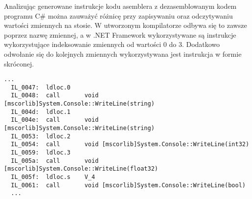 \par Analizując generowane instrukcje kodu asemblera z dezasemblowanym kodem programu C\# można zauważyć różnicę przy zapisywaniu oraz odczytywaniu wartości zmiennych na stosie. W utworzonym kompilatorze odbywa się to zawsze poprzez nazwę zmiennej, a w .NET Framework wykorzystywane są instrukcje wykorzystujące indeksowanie zmiennych od wartości 0 do 3. Dodatkowo odwołanie się do kolejnych zmiennych wykorzystywana jest instrukcja w formie skróconej.


\begin{lstlisting}[language=IL, caption={Fragment kodu deasemblerowanego testu programu C\#, przedstawiający ładowanie wartości zmiennych na stos}, label=alg:asm]
  ...
  IL_0047:  ldloc.0
  IL_0048:  call       void [mscorlib]System.Console::WriteLine(string)
  IL_004d:  ldloc.1
  IL_004e:  call       void [mscorlib]System.Console::WriteLine(string)
  IL_0053:  ldloc.2
  IL_0054:  call       void [mscorlib]System.Console::WriteLine(int32)
  IL_0059:  ldloc.3
  IL_005a:  call       void [mscorlib]System.Console::WriteLine(float32)
  IL_005f:  ldloc.s    V_4
  IL_0061:  call       void [mscorlib]System.Console::WriteLine(bool)
  ...
\end{lstlisting}

\par 




